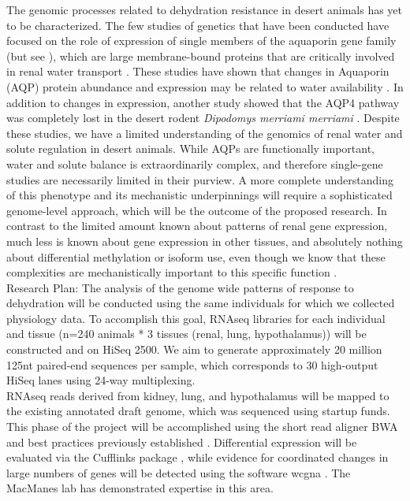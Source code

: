 \documentclass[11pt]{article}
\begin{document}
The genomic processes related to dehydration resistance in desert animals has yet to be characterized. The few studies of genetics that have been conducted have focused on the role of expression of single members of the aquaporin gene family (but see \cite{Bartolo:2007hy}), which are large membrane-bound proteins that are critically involved in renal water transport \citep{Kwon:2009bv,Verkman:2002ww,Brown:1995vo,Nielsen:1995cb}. These studies have shown that changes in Aquaporin (AQP) protein abundance and expression may be related to water availability \citep{Boselt:2009fb, Gallardo:2005fm,Bozinovic:2003eg}. In addition to changes in expression, another study showed that the AQP4 pathway was completely lost in the desert rodent \textit{Dipodomys merriami merriami} \citep{Huang:2001ti}. Despite these studies, we have a limited understanding of the genomics of renal water and solute regulation in desert animals. While AQPs are functionally important, water and solute balance is extraordinarily complex, and therefore single-gene studies are necessarily limited in their purview. A more complete understanding of this phenotype and its mechanistic underpinnings will require a sophisticated genome-level approach, which will be the outcome of the proposed research. In contrast to the limited amount known about patterns of renal gene expression, much less is known about gene expression in other tissues, and absolutely nothing about differential methylation or isoform use, even though we know that these complexities are mechanistically important to this specific function \citep{Yukutake:2010ia,Silberstein:2004ex}. \\

Research Plan: The analysis of the genome wide patterns of response to dehydration will be conducted using the same individuals for which we collected physiology data. To accomplish this goal, RNAseq libraries for each individual and tissue (n=240 animals * 3 tissues (renal, lung, hypothalamus)) will be constructed and on HiSeq 2500. We aim to generate approximately 20 million 125nt paired-end sequences per sample, which corresponds to 30 high-output HiSeq lanes using 24-way multiplexing. \\ 

RNAseq reads derived from kidney, lung, and hypothalamus will be mapped to the existing annotated draft genome, which was sequenced using startup funds. This phase of the project will be accomplished using the short read aligner BWA \citep{Li:2013wn} and best practices previously established \citep{MacManes:2014io}. Differential expression will be evaluated via the Cufflinks package \citep{Trapnell:2012kp}, while evidence for coordinated changes in large numbers of genes will be detected using the software wcgna \citep{Langfelder:2008bd}. The MacManes lab has demonstrated expertise in this area. \\
\end{document}
